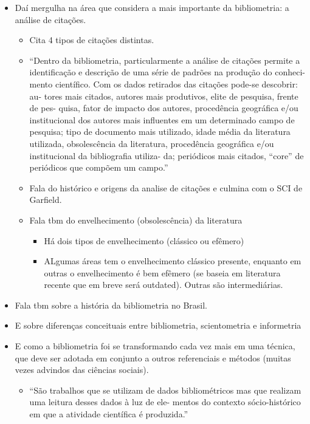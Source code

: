 \documentclass[11pt]{article}
\begin{document}
\begin{itemize}
\item Daí mergulha na área que considera a mais importante da bibliometria: a análise de citações.
\begin{itemize}
\item Cita 4 tipos de citações distintas.
\item ``Dentro da bibliometria, particularmente a análise de citações permite a identificação e descrição de uma série de padrões na produção do conheci- mento científico. Com os dados retirados das citações pode-se descobrir: au- tores mais citados, autores mais produtivos, elite de pesquisa, frente de pes- quisa, fator de impacto dos autores, procedência geográfica e/ou institucional dos autores mais influentes em um determinado campo de pesquisa; tipo de documento mais utilizado, idade média da literatura utilizada, obsolescência da literatura, procedência geográfica e/ou institucional da bibliografia utiliza- da; periódicos mais citados, “core” de periódicos que compõem um campo.''
\item Fala do histórico e origens da analise de citações e culmina com o SCI de Garfield.
\item Fala tbm do envelhecimento (obsolescência) da literatura
\begin{itemize}
\item Há dois tipos de envelhecimento (clássico ou efêmero)
\item ALgumas áreas tem o envelhecimento clássico presente, enquanto em outras o envelhecimento é bem efêmero (se baseia em literatura recente que em breve será outdated). Outras são intermediárias.
\end{itemize}
\end{itemize}

\item Fala tbm sobre a história da bibliometria no Brasil.
\item E sobre diferenças conceituais entre bibliometria, scientometria e informetria
\item E como a bibliometria foi se transformando cada vez mais em uma técnica, que deve ser adotada em conjunto a outros referenciais e métodos (muitas vezes advindos das ciências sociais).
\begin{itemize}
\item ``São trabalhos que se utilizam de dados bibliométricos mas que realizam uma leitura desses dados à luz de ele- mentos do contexto sócio-histórico em que a atividade científica é produzida.''
\end{itemize}


\end{itemize}
\end{document}
